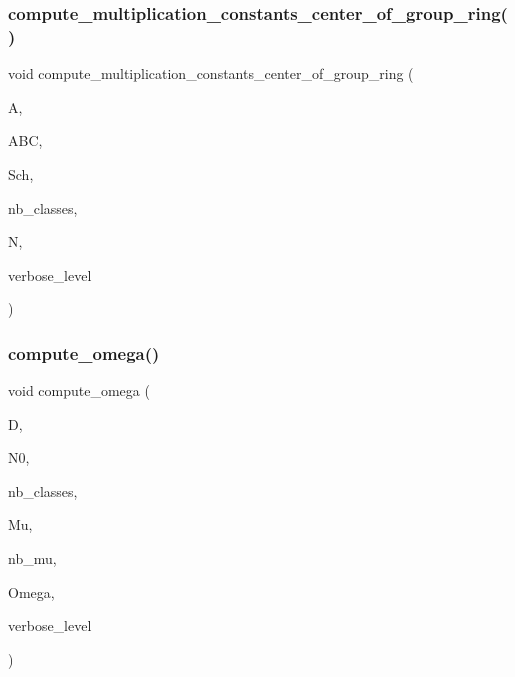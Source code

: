 \subsubsection{\texorpdfstring{compute\+\_\+multiplication\+\_\+constants\+\_\+center\+\_\+of\+\_\+group\+\_\+ring()}{compute\_multiplication\_constants\_center\_of\_group\_ring()}}
{\footnotesize\ttfamily void compute\+\_\+multiplication\+\_\+constants\+\_\+center\+\_\+of\+\_\+group\+\_\+ring (\begin{DoxyParamCaption}\item[{\mbox{\hyperlink{classaction}{action}} $\ast$}]{A,  }\item[{\mbox{\hyperlink{classaction__by__conjugation}{action\+\_\+by\+\_\+conjugation}} $\ast$}]{A\+BC,  }\item[{\mbox{\hyperlink{classschreier}{schreier}} $\ast$}]{Sch,  }\item[{\mbox{\hyperlink{galois_8h_a09fddde158a3a20bd2dcadb609de11dc}{I\+NT}}}]{nb\+\_\+classes,  }\item[{\mbox{\hyperlink{galois_8h_a09fddde158a3a20bd2dcadb609de11dc}{I\+NT}} $\ast$\&}]{N,  }\item[{\mbox{\hyperlink{galois_8h_a09fddde158a3a20bd2dcadb609de11dc}{I\+NT}}}]{verbose\+\_\+level }\end{DoxyParamCaption})}

\mbox{\label{burnside_8_c_a2c04ffa6cca9279a5f5b8fdd4ead95ce}} 
\subsubsection{\texorpdfstring{compute\+\_\+omega()}{compute\_omega()}}
{\footnotesize\ttfamily void compute\+\_\+omega (\begin{DoxyParamCaption}\item[{\mbox{\hyperlink{classa__domain}{a\+\_\+domain}} $\ast$}]{D,  }\item[{\mbox{\hyperlink{galois_8h_a09fddde158a3a20bd2dcadb609de11dc}{I\+NT}} $\ast$}]{N0,  }\item[{\mbox{\hyperlink{galois_8h_a09fddde158a3a20bd2dcadb609de11dc}{I\+NT}}}]{nb\+\_\+classes,  }\item[{\mbox{\hyperlink{galois_8h_a09fddde158a3a20bd2dcadb609de11dc}{I\+NT}} $\ast$}]{Mu,  }\item[{\mbox{\hyperlink{galois_8h_a09fddde158a3a20bd2dcadb609de11dc}{I\+NT}}}]{nb\+\_\+mu,  }\item[{\mbox{\hyperlink{galois_8h_a09fddde158a3a20bd2dcadb609de11dc}{I\+NT}} $\ast$\&}]{Omega,  }\item[{\mbox{\hyperlink{galois_8h_a09fddde158a3a20bd2dcadb609de11dc}{I\+NT}}}]{verbose\+\_\+level }\end{DoxyParamCaption})}

